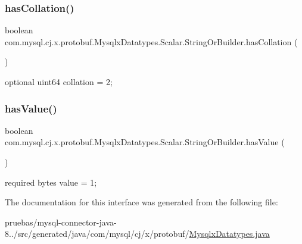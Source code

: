 \subsubsection{\texorpdfstring{has\+Collation()}{hasCollation()}}
{\footnotesize\ttfamily boolean com.\+mysql.\+cj.\+x.\+protobuf.\+Mysqlx\+Datatypes.\+Scalar.\+String\+Or\+Builder.\+has\+Collation (\begin{DoxyParamCaption}{ }\end{DoxyParamCaption})}

{\ttfamily optional uint64 collation = 2;} \mbox{\label{interfacecom_1_1mysql_1_1cj_1_1x_1_1protobuf_1_1_mysqlx_datatypes_1_1_scalar_1_1_string_or_builder_a08394cea2016128a422efdf2fea938e8}} 
\subsubsection{\texorpdfstring{has\+Value()}{hasValue()}}
{\footnotesize\ttfamily boolean com.\+mysql.\+cj.\+x.\+protobuf.\+Mysqlx\+Datatypes.\+Scalar.\+String\+Or\+Builder.\+has\+Value (\begin{DoxyParamCaption}{ }\end{DoxyParamCaption})}

{\ttfamily required bytes value = 1;} 

The documentation for this interface was generated from the following file\+:\begin{DoxyCompactItemize}
\item 
pruebas/mysql-\/connector-\/java-\/8../src/generated/java/com/mysql/cj/x/protobuf/\mbox{\hyperlink{_mysqlx_datatypes_8java}{Mysqlx\+Datatypes.\+java}}\end{DoxyCompactItemize}
